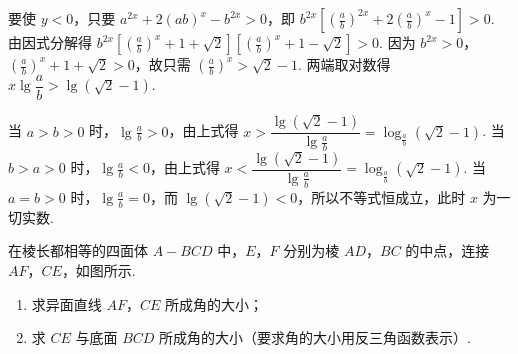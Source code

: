 \begin{solution}
要使 \(y<0\)，只要 \(a^{2x}+2(ab)^x-b^{2x}>0\)，即 \(b^{2x}\left[ \left( \frac{a}{b} \right)^{2x}+2\left( \frac{a}{b} \right)^x-1 \right]>0\). 由因式分解得 \(b^{2x}\left[ \left( \frac{a}{b} \right)^x+1+\sqrt{2} \right]\left[ \left( \frac{a}{b} \right)^x+1-\sqrt{2} \right]>0\). 因为 \(b^{2x}>0\)，\(\left( \frac{a}{b} \right)^x+1+\sqrt{2}>0\)，故只需 \(\left( \frac{a}{b} \right)^x>\sqrt{2}-1\). 两端取对数得 \(x\lg\dfrac{a}{b}>\lg(\sqrt{2}-1)\).

当 \(a>b>0\) 时，\(\lg\frac{a}{b}>0\)，由上式得 \(x>\dfrac{\lg(\sqrt{2}-1)}{\lg\frac{a}{b}}=\log_{\frac{a}{b}}(\sqrt{2}-1)\). 当 \(b>a>0\) 时，\(\lg\frac{a}{b}<0\)，由上式得 \(x<\dfrac{\lg(\sqrt{2}-1)}{\lg\frac{a}{b}}=\log_{\frac{a}{b}}(\sqrt{2}-1)\). 当 \(a=b>0\) 时，\(\lg\frac{a}{b}=0\)，而 \(\lg(\sqrt{2}-1)<0\)，所以不等式恒成立，此时 \(x\) 为一切实数.
\end{solution}

\begin{problem}
在棱长都相等的四面体 \(A-BCD\) 中，\(E\)，\(F\) 分别为棱 \(AD\)，\(BC\) 的中点，连接 \(AF\)，\(CE\)，如图所示.

\begin{enumerate}
\item 求异面直线 \(AF\)，\(CE\) 所成角的大小；
\item 求 \(CE\) 与底面 \(BCD\) 所成角的大小（要求角的大小用反三角函数表示）.
\end{enumerate}

\end{problem}

